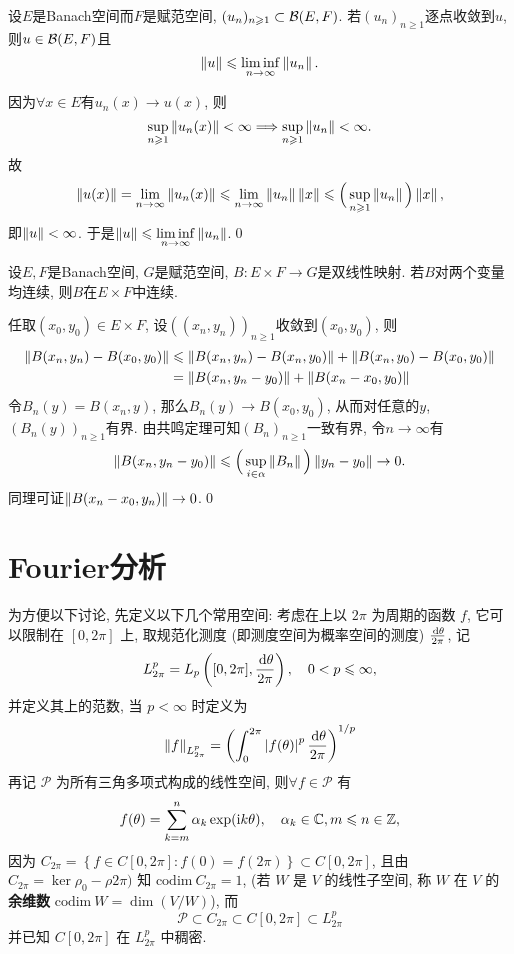	\begin{Corollary}
	设$ E $是Banach空间而$ F $是赋范空间, $ (u_n)_{n\geqslant 1}\subset\mathcal{B}(E,F) $. 若$ (u_n)_{n\geqslant 1} $逐点收敛到$ u $, 则$ u\in\mathcal{B}(E,F) $且
	\[
	\left\| u \right\|\leqslant\liminf_{n\to\infty}\left\| u_n \right\|.
	\]
	\end{Corollary}
	\begin{Proof}
	因为$ \forall x\in E $有$ u_n(x)\to u(x) $, 则
	\[
	\sup_{n\geqslant 1}\left\| u_n(x) \right\|<\infty\Longrightarrow\sup_{n\geqslant 1}\left\| u_n \right\|<\infty.
	\]
	故
	\[
	\left\| u(x) \right\|=\lim_{n\to\infty}\left\| u_n(x) \right\|\leqslant\lim_{n\to\infty}\left\| u_n \right\|\left\| x \right\|\leqslant\Big( \sup_{n\geqslant 1}\left\| u_n \right\| \Big)\left\| x \right\|,
	\]
	即$ \left\| u \right\|<\infty $. 于是$ \left\| u \right\|\leqslant\liminf\limits_{n\to\infty}\left\| u_n \right\| $.\qed
	\end{Proof}
	
	\begin{Corollary}
	设$ E, F $是Banach空间, $ G $是赋范空间, $ B : E\times F\to G $是双线性映射. 若$ B $对两个变量均连续, 则$ B $在$ E\times F $中连续.
	\end{Corollary}
	\begin{Proof}
	任取$ (x_0,y_0)\in E\times F $, 设$ ((x_n,y_n))_{n\geqslant 1} $收敛到$ (x_0,y_0) $, 则
	\[
	\begin{aligned}
	\left\| B(x_n,y_n)-B(x_0,y_0) \right\|&\leqslant\left\| B(x_n,y_n)-B(x_n,y_0) \right\|+\left\| B(x_n,y_0)-B(x_0,y_0) \right\|\\
	&=\left\| B(x_n,y_n-y_0) \right\|+\left\| B(x_n-x_0,y_0) \right\|
	\end{aligned}
	\]
	令$ B_n(y)=B(x_n,y) $, 那么$ B_n(y)\to B(x_0,y_0) $, 从而对任意的$ y $, $ (B_n(y))_{n\geqslant 1} $有界. 由共鸣定理可知$ (B_n)_{n\geqslant 1} $一致有界, 令$ n\to\infty $有
	\[
	\left\| B(x_n,y_n-y_0) \right\|\leqslant\Big( \sup_{i\in\alpha}\left\| B_n \right\| \Big)\left\| y_n-y_0 \right\|\to 0.
	\]
	同理可证$ \left\| B(x_n-x_0,y_n) \right\|\to 0 $.\qed
	\end{Proof}
	

\section{Fourier分析}
	为方便以下讨论, 先定义以下几个常用空间: 考虑在\R 上以 $ 2\pi $ 为周期的函数 $ f $, 它可以限制在 $ [0, 2\pi] $ 上, 取规范化测度 (即测度空间为概率空间的测度) $ \frac{\,\mathrm{d}\theta}{2\pi} $, 记
	\[
		L_{2\pi}^{p}=L_{p}\left([0, 2\pi], \frac{\,\mathrm{d}\theta}{2\pi}\right), \quad 0<p\leqslant\infty,
	\]
	并定义其上的范数, 当 $ p<\infty $ 时定义为
	\[
		\left\| f \right\|_{L_{2\pi}^{p}}=\left( \int_{0}^{2\pi}\left| f(\theta) \right| ^{p}\frac{\,\mathrm{d}\theta}{2\pi} \right)^{1/p}
	\]
	再记 $ \mathcal{P} $ 为所有三角多项式构成的线性空间, 则$ \forall f\in\mathcal{P} $ 有
	\[
		f(\theta)=\sum_{k=m}^{n}\alpha_{k}\exp(\mathrm{i} k\theta), \quad \alpha_{k}\in\mathbb{C}, m\leqslant n\in\mathbb{Z},
	\]
	因为 $ C_{2\pi}=\left\{ f\in C[0, 2\pi]: f(0)=f(2\pi) \right\}\subset C[0, 2\pi] $, 且由 $ C_{2\pi}=\ker\rho_{0}-\rho{2\pi}) $ 知 $ \mathrm{codim}\ C_{2\pi}=1 $, (若 $ W $ 是 $ V $ 的线性子空间, 称 $ W $ 在 $ V $ 的\textbf{余维数} $ \mathrm{codim}\ W=\dim (V/W) $), 而
	\[
		\mathcal{P}\subset C_{2\pi}\subset C[0, 2\pi]\subset L_{2\pi}^{p}
	\]
	并已知 $ C[0, 2\pi] $ 在 $ L_{2\pi}^{p} $ 中稠密. 

